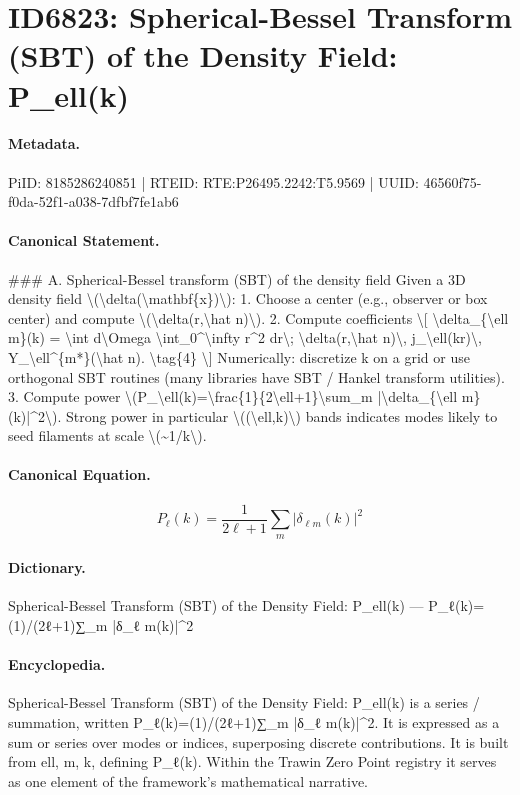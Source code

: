 \section*{ID6823: Spherical-Bessel Transform (SBT) of the Density Field: P\_ell(k)}
\paragraph{Metadata.}
PiID: 8185286240851 | RTEID: RTE:P26495.2242:T5.9569 | UUID: 46560f75-f0da-52f1-a038-7dfbf7fe1ab6

\paragraph{Canonical Statement.}
\#\#\# A. Spherical-Bessel transform (SBT) of the density field Given a 3D density field \textbackslash{}(\textbackslash{}delta(\textbackslash{}mathbf\{x\})\textbackslash{}): 1. Choose a center (e.g., observer or box center) and compute \textbackslash{}(\textbackslash{}delta(r,\textbackslash{}hat n)\textbackslash{}). 2. Compute coefficients \textbackslash{}[ \textbackslash{}delta\_\{\textbackslash{}ell m\}(k) = \textbackslash{}int d\textbackslash{}Omega \textbackslash{}int\_0\textasciicircum{}\textbackslash{}infty r\textasciicircum{}2 dr\textbackslash{}; \textbackslash{}delta(r,\textbackslash{}hat n)\textbackslash{}, j\_\textbackslash{}ell(kr)\textbackslash{}, Y\_\textbackslash{}ell\textasciicircum{}\{m*\}(\textbackslash{}hat n). \textbackslash{}tag\{4\} \textbackslash{}] Numerically: discretize k on a grid or use orthogonal SBT routines (many libraries have SBT / Hankel transform utilities). 3. Compute power \textbackslash{}(P\_\textbackslash{}ell(k)=\textbackslash{}frac\{1\}\{2\textbackslash{}ell+1\}\textbackslash{}sum\_m |\textbackslash{}delta\_\{\textbackslash{}ell m\}(k)|\textasciicircum{}2\textbackslash{}). Strong power in particular \textbackslash{}((\textbackslash{}ell,k)\textbackslash{}) bands indicates modes likely to seed filaments at scale \textbackslash{}(\textasciitilde{}1/k\textbackslash{}).

\paragraph{Canonical Equation.}
\[
P_\ell(k)=\frac{1}{2\ell+1}\sum_m |\delta_{\ell m}(k)|^2
\]

\paragraph{Dictionary.}
Spherical-Bessel Transform (SBT) of the Density Field: P\_ell(k) — P\_ℓ(k)=(1)/(2ℓ+1)∑\_m |δ\_ℓ m(k)|\textasciicircum{}2

\paragraph{Encyclopedia.}
Spherical-Bessel Transform (SBT) of the Density Field: P\_ell(k) is a series / summation, written P\_ℓ(k)=(1)/(2ℓ+1)∑\_m |δ\_ℓ m(k)|\textasciicircum{}2. It is expressed as a sum or series over modes or indices, superposing discrete contributions. It is built from ell, m, k, defining P\_ℓ(k). Within the Trawin Zero Point registry it serves as one element of the framework's mathematical narrative.
